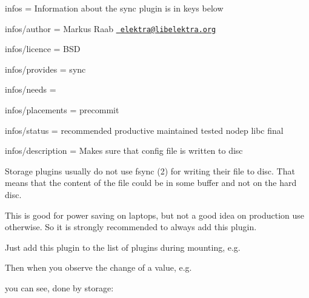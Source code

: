 
\begin{DoxyItemize}
\item infos = Information about the sync plugin is in keys below
\item infos/author = Markus Raab \href{mailto:elektra@libelektra.org}{\texttt{ elektra@libelektra.\+org}}
\item infos/licence = B\+SD
\item infos/provides = sync
\item infos/needs =
\item infos/placements = precommit
\item infos/status = recommended productive maintained tested nodep libc final
\item infos/description = Makes sure that config file is written to disc
\end{DoxyItemize}

Storage plugins usually do not use fsync (2) for writing their file to disc. That means that the content of the file could be in some buffer and not on the hard disc.

This is good for power saving on laptops, but not a good idea on production use otherwise. So it is strongly recommended to always add this plugin.

Just add this plugin to the list of plugins during mounting, e.\+g.


\begin{DoxyCode}{0}
\end{DoxyCode}


Then when you observe the change of a value, e.\+g.


\begin{DoxyCode}{0}
\end{DoxyCode}


you can see, done by storage\+:


\begin{DoxyCode}{0}
\end{DoxyCode}


